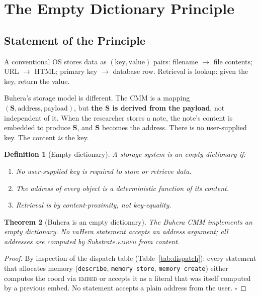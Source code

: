 \documentclass[11pt,twocolumn,a4paper]{article}
\newtheorem{theorem}{Theorem}[section]
\newtheorem{definition}[theorem]{Definition}
\newcommand{\Scoord}{\mathbf{S}}
\begin{document}
\section{The Empty Dictionary Principle}
\label{sec:empty_dict}

\subsection{Statement of the Principle}

A conventional OS stores data as $(\text{key}, \text{value})$ pairs: filename $\to$ file contents; URL $\to$ HTML; primary key $\to$ database row. Retrieval is lookup: given the key, return the value.

Buhera's storage model is different. The CMM is a mapping $(\Scoord, \text{address}, \text{payload})$, but \textbf{the $\Scoord$ is derived from the payload}, not independent of it. When the researcher stores a note, the note's content is embedded to produce $\Scoord$, and $\Scoord$ becomes the address. There is no user-supplied key. The content \emph{is} the key.

\begin{definition}[Empty dictionary]
A storage system is an \emph{empty dictionary} if:
\begin{enumerate}
\item No user-supplied key is required to store or retrieve data.
\item The address of every object is a deterministic function of its content.
\item Retrieval is by content-proximity, not key-equality.
\end{enumerate}
\end{definition}

\begin{theorem}[Buhera is an empty dictionary]
The Buhera CMM implements an empty dictionary. No vaHera statement accepts an address argument; all addresses are computed by Substrate.\textsc{embed} from content.
\end{theorem}

\begin{proof}
By inspection of the dispatch table (Table~\ref{tab:dispatch}): every statement that allocates memory (\texttt{describe}, \texttt{memory store}, \texttt{memory create}) either computes the coord via \textsc{embed} or accepts it as a literal that was itself computed by a previous embed. No statement accepts a plain address from the user. $\square$
\end{proof}
\end{document}
